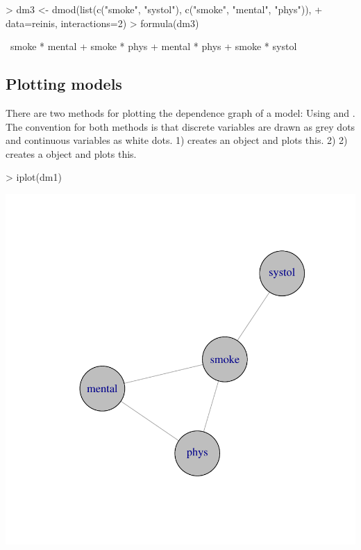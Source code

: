 \documentclass[12pt]{article}
\begin{document}
\begin{Schunk}
\begin{Sinput}
> dm3 <- dmod(list(c("smoke", "systol"), c("smoke", "mental", "phys")),
+             data=reinis, interactions=2)
> formula(dm3)
\end{Sinput}
\begin{Soutput}
~smoke * mental + smoke * phys + mental * phys + smoke * systol
\end{Soutput}
\end{Schunk}

\subsection{Plotting models}
\label{sec:xxx}

There are two methods for plotting the dependence graph of a model:
Using  and . The convention for both
methods is that discrete variables are drawn as grey dots and
continuous variables as white dots.  1)  creates an
 object and plots this. 2) 2)  creates a
 object and plots this.

\begin{Schunk}
\begin{Sinput}
> iplot(dm1)
\end{Sinput}
\end{Schunk}
\includegraphics{figures/GRIM-011}
\end{document}

